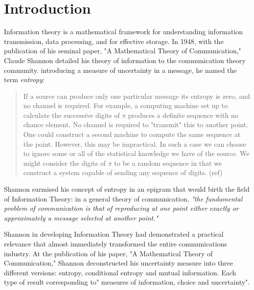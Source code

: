 \documentclass[12pt]{article}
\begin{document}
	
	
	\section{Introduction}
	
	Information theory is a mathematical framework for understanding information transmission, data processing, and for effective storage. In 1948, with the publication of his seminal paper, "A Mathematical Theory of Communication," Claude Shannon detailed his theory of information to the communication theory community. introducing a measure of uncertainty in a message, he named the term \emph{entropy}:
	
	\begin{quote}
	{If a source can produce only one particular message its entropy is zero, and no channel is required. For example, a computing machine set up to calculate the successive digits of $\pi$ produces a definite sequence with no chance element. No channel is required to "transmit" this to another point. One could construct a second machine to compute the same sequence at the point. However, this may be impractical. In such a case we can choose to ignore some or all of the statistical knowledge we have of the source. We might consider the digits of $\pi$ to be a random sequence in that we construct a system capable of sending any sequence of digits.} (ref)
	\end{quote}
	
	Shannon surmised his concept of entropy in an epigram that would birth the field of Information Theory: in a general theory of communication, \emph{"the fundamental problem of communication is that of reproducing at one point either exactly or approximately a message selected at another point."}
	
	 Shannon in developing Information Theory had demonstrated a practical relevance that  almost immediately transformed the entire communications industry. At the publication of his paper, "A Mathematical Theory of Communication," Shannon deconstructed his uncertainty measure into three different versions: entropy, conditional entropy and mutual information. Each type of result corresponding to" measures of information, choice and uncertainty".
\end{document}
